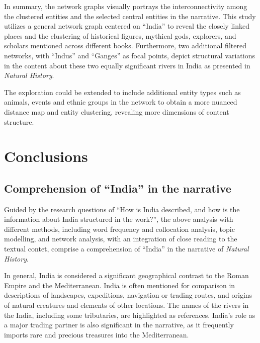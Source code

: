 \documentclass[
  12pt,
]{article}
\begin{document}
In summary, the network graphs visually portrays the interconnectivity
among the clustered entities and the selected central entities in the
narrative. This study utilizes a general network graph centered on
``India'' to reveal the closely linked places and the clustering of
historical figures, mythical gods, explorers, and scholars mentioned
across different books. Furthermore, two additional filtered networks,
with ``Indus'' and ``Ganges'' as focal points, depict structural
variations in the content about these two equally significant rivers in
India as presented in \emph{Natural History}.

The exploration could be extended to include additional entity types
such as animals, events and ethnic groups in the network to obtain a
more nuanced distance map and entity clustering, revealing more
dimensions of content structure.

\newpage

\hypertarget{sec-conclusions}{%
\section{Conclusions}\label{sec-conclusions}}

\hypertarget{comprehension-of-india-in-the-narrative}{%
\subsection{Comprehension of ``India'' in the
narrative}\label{comprehension-of-india-in-the-narrative}}

Guided by the research questions of ``How is India described, and how is
the information about India structured in the work?'', the above
analysis with different methods, including word frequency and
collocation analysis, topic modelling, and network analysis, with an
integration of close reading to the textual contet, comprise a
comprehension of ``India'' in the narrative of \emph{Natural History}.

In general, India is considered a significant geographical contrast to
the Roman Empire and the Mediterranean. India is often mentioned for
comparison in descriptions of landscapes, expeditions, navigation or
trading routes, and origins of natural creatures and elements of other
locations. The names of the rivers in the India, including some
tributaries, are highlighted as references. India's role as a major
trading partner is also significant in the narrative, as it frequently
imports rare and precious treasures into the Mediterranean.
\end{document}
